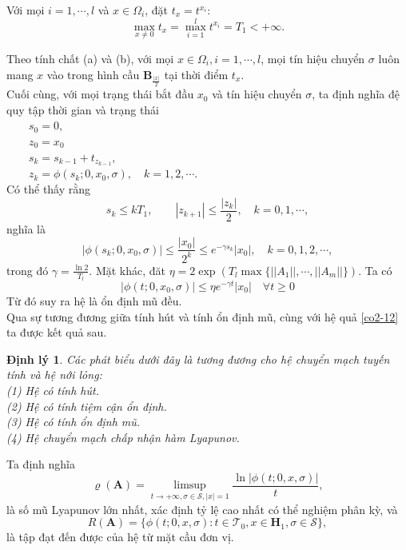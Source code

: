 \documentclass[14pt,a4paper,oneside]{report}		%
\newtheorem{theorem}{Định lý}[chapter]
\begin{document}
Với mọi $i=1,\cdots,l$ và $x\in\Omega_i$, đặt $t_x = t^{x_i}$:
\begin{equation} \label{eq2-25}
\max_{x\neq 0}t_x = \max_{i=1}^lt^{x_i}=T_1 <+\infty.
\end{equation}

Theo tính chất (a) và (b), với mọi $x\in\Omega_i, i=1,\cdots,l$, mọi tín hiệu chuyển $\sigma$ luôn mang $x$ vào trong hình cầu $\mathbf{B}_{\frac{|x|}{2}}$ tại thời điểm $t_x$.\\

Cuối cùng, với mọi trạng thái bắt đầu $x_0$ và tín hiệu chuyển $\sigma$, ta định nghĩa đệ quy tập thời gian và trạng thái\\
$\qquad s_0=0,$\\
$\qquad z_0=x_0$\\
$\qquad s_k=s_{k-1}+t_{z_{k-1}},$\\
$\qquad z_k = \phi (s_k;0,x_0,\sigma),\quad k=1,2,\cdots.$\\
Có thể thấy rằng
\begin{equation} \label{eq2-26}
s_k \leq kT_1,\qquad |z_{k+1}|\leq \frac{|z_k|}{2}, \quad k=0,1,\cdots,
\end{equation}
nghĩa là 
$$|\phi(s_k;0,x_0,\sigma)|\leq\frac{|x_0|}{2^k}\leq e^{-\gamma s_k}|x_0|,\quad k=0,1,2,\cdots,$$
trong đó $\gamma = \frac{\ln 2}{T_l}$. Mặt khác, đăt $\eta = 2\exp(T_l\max\{||A_1||,\cdots,||A_m||\})$. Ta có
\begin{equation} \label{eq2-27}
|\phi (t;0,x_0,\sigma)|\leq \eta e^{-\gamma t}|x_0|\quad \forall t\geq 0
\end{equation}
Từ đó suy ra hệ là ổn định mũ đều.\\

Qua sự tương đương giữa tính hút và tính ổn định mũ, cùng với hệ quả \ref{co2-12} ta được kết quả sau.

\begin{theorem}\label{the2-15}
Các phát biểu dưới đây là tương đương cho hệ chuyển mạch tuyến tính và hệ nới lỏng:\\
(1) Hệ có tính hút.\\
(2) Hệ có tính tiệm cận ổn định.\\
(3) Hệ có tính ổn định mũ.\\
(4) Hệ chuyển mạch chấp nhận hàm Lyapunov.
\end{theorem}
Ta định nghĩa
\begin{equation}\label{eq2-28}
\varrho (\mathbf{A})=\limsup_{t\rightarrow +\infty,\sigma\in\mathcal{S},|x|=1}\frac{\ln|\phi(t;0,x,\sigma)|}{t},
\end{equation}
là số mũ Lyapunov lớn nhất, xác định tỷ lệ cao nhất có thể nghiệm phân kỳ, và
\begin{equation}\label{eq2-29}
R(\mathbf{A})=\{\phi (t;0,x,\sigma):t\in\mathcal{T}_0,x\in\mathbf{H}_1,\sigma\in\mathcal{S}\},
\end{equation}
là tập đạt đến được của hệ từ mặt cầu đơn vị.
\end{document}
